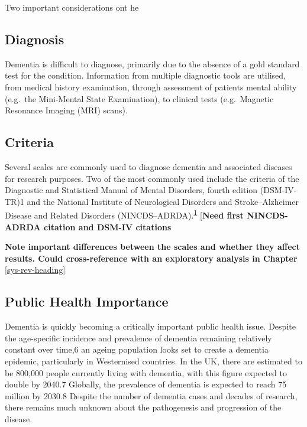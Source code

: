 \documentclass[a4paper, twoside]{templates/ociamthesis}
\begin{document}
Two important considerations ont he

\hypertarget{diagnosis}{%
\subsection{Diagnosis}\label{diagnosis}}

Dementia is difficult to diagnose, primarily due to the absence of a gold standard test for the condition. Information from multiple diagnostic tools are utilised, from medical history examination, through assessment of patients mental ability (e.g.~the Mini-Mental State Examination), to clinical tests (e.g.~Magnetic Resonance Imaging (MRI) scans).

\hypertarget{criteria}{%
\subsection{Criteria}\label{criteria}}

Several scales are commonly used to diagnose dementia and associated diseases for research purposes. Two of the most commonly used include the criteria of the Diagnostic and Statistical Manual of Mental Disorders, fourth edition (DSM-IV-TR)1 and the National Institute of Neurological Disorders and Stroke--Alzheimer Disease and Related Disorders (NINCDS--ADRDA).\textsuperscript{\protect\hyperlink{ref-dubois2007}{1}} {[}\textbf{Need first NINCDS-ADRDA citation and DSM-IV citations}

\textbf{Note important differences between the scales and whether they affect results. Could cross-reference with an exploratory analysis in Chapter} \ref{sys-rev-heading}

\hypertarget{public-health-importance}{%
\subsection{Public Health Importance}\label{public-health-importance}}

Dementia is quickly becoming a critically important public health issue. Despite the age-specific incidence and prevalence of dementia remaining relatively constant over time,6 an ageing population looks set to create a dementia epidemic, particularly in Westernised countries. In the UK, there are estimated to be 800,000 people currently living with dementia, with this figure expected to double by 2040.7 Globally, the prevalence of dementia is expected to reach 75 million by 2030.8 Despite the number of dementia cases and decades of research, there remains much unknown about the pathogenesis and progression of the disease.
\end{document}
